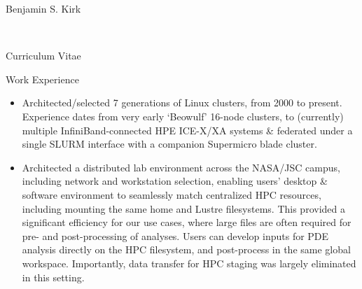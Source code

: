 \documentclass[10pt]{report}
\begin{document}
\begin{cv}{\centerline{\Large Benjamin S. Kirk}\\
    \centerline{\large Curriculum Vitae}}
\begin{cvlist}{Work Experience}
\begin{itemize}
\begin{itemize}
      \item
	Architected/selected 7 generations of Linux clusters, from 2000 to present.  Experience dates from very early ‘Beowulf’ 16-node clusters, to (currently) multiple InfiniBand-connected HPE ICE-X/XA systems \& federated under a single SLURM interface with a companion Supermicro blade cluster.
      \item
	Architected a distributed lab environment across the NASA/JSC campus, including network and workstation selection, enabling users’ desktop \& software environment to seamlessly match centralized HPC resources, including mounting the same home and Lustre filesystems.  This provided a significant efficiency for our use cases, where large files are often required for pre- and post-processing of analyses.  Users can develop inputs for PDE analysis directly on the HPC filesystem, and post-process in the same global workspace.  Importantly, data transfer for HPC staging was largely eliminated in this setting.
    \end{itemize}


\end{itemize}
\end{cvlist}
\end{cv}
\end{document}
